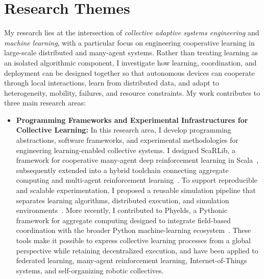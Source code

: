 \documentclass[10pt,a4paper,roman]{moderncv}        %
\newenvironment{cvprose}%
  {\begin{list}{}{%
     \setlength{\leftmargin}{\dimexpr\hintscolumnwidth+\separatorcolumnwidth\relax}%
     \setlength{\rightmargin}{0pt}%
     \setlength{\listparindent}{0pt}%
     \setlength{\itemindent}{0pt}%
     \setlength{\labelwidth}{0pt}%
     \setlength{\topsep}{.25em}%
     \setlength{\parsep}{.5em}%
     \setlength{\partopsep}{0pt}}%
   \item\relax}%
  {\end{list}}
\newcommand{\cvsection}[1]{\Needspace{6\baselineskip}\section{#1}}
\begin{document}
\cvsection{Research Themes}\label{sec:research-themes}
\begin{cvprose}
My research lies at the intersection of \emph{collective adaptive systems engineering} and \emph{machine learning}, 
 with a particular focus on engineering cooperative learning in large-scale distributed and many-agent systems. 
% 
Rather than treating learning as an isolated algorithmic component, 
 I investigate how learning, coordination, and deployment can be designed together 
 so that autonomous devices can cooperate through local interactions, 
 learn from distributed data, and adapt to heterogeneity, mobility, failures, and resource constraints. 
% 
My work contributes to three main research areas:

\begin{itemize}
\item \textbf{Programming Frameworks and Experimental Infrastructures for Collective Learning:}
In this research area, 
 I develop programming abstractions, software frameworks, and experimental methodologies 
 for engineering learning-enabled collective systems.
%
I designed ScaRLib, 
 a framework for cooperative many-agent deep reinforcement learning in Scala~, 
 subsequently extended into a hybrid toolchain connecting aggregate computing 
 and multi-agent reinforcement learning~.
%
To support reproducible and scalable experimentation, 
 I proposed a reusable simulation pipeline that separates learning algorithms, distributed execution, 
 and simulation environments~.
%
More recently, I contributed to Phyelds, 
 a Pythonic framework for aggregate computing designed to integrate field-based coordination 
 with the broader Python machine-learning ecosystem~.
%
These tools make it possible to express collective learning processes from a global perspective 
 while retaining decentralized execution, and have been applied to federated learning, 
 many-agent reinforcement learning, Internet-of-Things systems, and self-organizing robotic collectives.


\end{itemize}
\end{cvprose}
\end{document}
